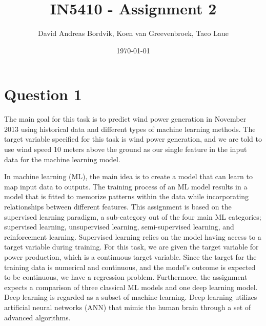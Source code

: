 \documentclass[11pt]{article}
\title{IN5410 - Assignment 2}
\author{David Andreas Bordvik, Koen van Greevenbroek, Taeo Laue}
\date{\today}
\begin{document}
\maketitle

\section*{Question 1}
The main goal for this task is to predict wind power generation in November 2013 using historical data and different types of machine learning methods. The target variable specified for this task is wind power generation, and we are told to use wind speed 10 meters above the ground as our single feature in the input data for the machine learning model.

In machine learning (ML), the main idea is to create a model that can learn to map input data to outputs. The training process of an ML model results in a model that is fitted to memorize patterns within the data while incorporating relationships between different features. This assignment is based on the supervised learning paradigm, a sub-category out of the four main ML categories; supervised learning, unsupervised learning, semi-supervised learning, and reinforcement learning. Supervised learning relies on the model having access to a target variable during training. For this task, we are given the target variable for power production, which is a continuous target variable. Since the target for the training data is numerical and continuous, and the model's outcome is expected to be continuous, we have a regression problem. Furthermore, the assignment expects a comparison of three classical ML models and one deep learning model. Deep learning is regarded as a subset of machine learning. Deep learning utilizes artificial neural networks (ANN) that mimic the human brain through a set of advanced algorithms. 
\end{document}
